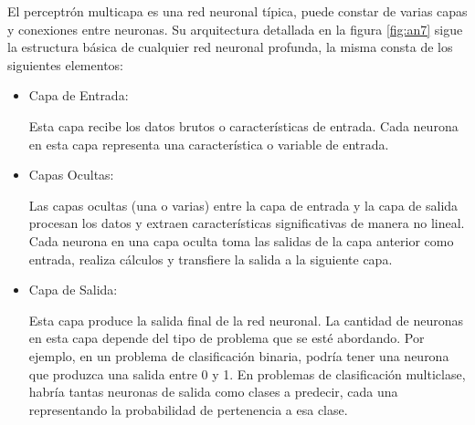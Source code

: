 El perceptrón multicapa es una red neuronal típica, puede constar de varias capas y conexiones entre neuronas. Su arquitectura detallada en la figura \ref{fig:an7} sigue la estructura básica de cualquier red neuronal profunda, la misma consta de los siguientes elementos: 
\begin{itemize}

	\item Capa de Entrada: 
	
	Esta capa recibe los datos brutos o características de entrada. Cada neurona en esta capa representa una característica o variable de entrada.

	\item Capas Ocultas: 
	
	Las capas ocultas (una o varias) entre la capa de entrada y la capa de salida procesan los datos y extraen características significativas de manera no lineal. Cada neurona en una capa oculta toma las salidas de la capa anterior como entrada, realiza cálculos y transfiere la salida a la siguiente capa.

	\item Capa de Salida:
	
	Esta capa produce la salida final de la red neuronal. La cantidad de neuronas en esta capa depende del tipo de problema que se esté abordando. Por ejemplo, en un problema de clasificación binaria, podría tener una neurona que produzca una salida entre 0 y 1. En problemas de clasificación multiclase, habría tantas neuronas de salida como clases a predecir, cada una representando la probabilidad de pertenencia a esa clase.
\end{itemize}